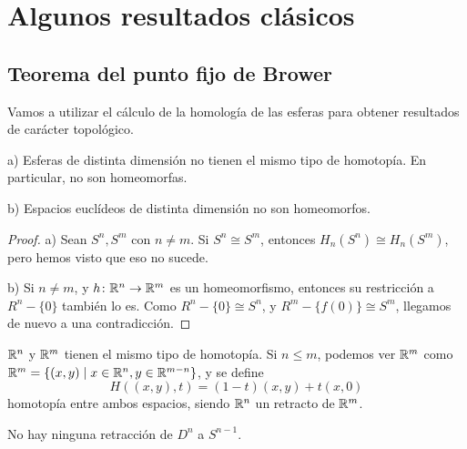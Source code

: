 \chapter{Algunos resultados clásicos}\label{ch:resultados}

\section{Teorema del punto fijo de Brower}

Vamos a utilizar el cálculo de la homología de las esferas para obtener resultados
de carácter topológico.

\begin{proposition}
  a) Esferas de distinta dimensión no tienen el mismo tipo de homotopía. En particular, no son homeomorfas.

  b) Espacios euclídeos de distinta dimensión no son homeomorfos.
\end{proposition}

\begin{proof}
  a) Sean $S^n, S^m$ con $n \neq m$. Si $S^n \cong S^m$, entonces $H_n(S^n) \cong H_n(S^m)$, pero hemos visto que eso no sucede.

  b) Si $n \neq m$, y $h \colon \mathbb{R}^n \to \mathbb{R}^m$ es un homeomorfismo, entonces su restricción a $R^n - \{0\}$ también lo es.
  Como $R^n - \{0\} \cong S^n$, y $R^m - \{f(0)\} \cong S^m$, llegamos de nuevo a una contradicción.
\end{proof}

\begin{remark}
  $\mathbb{R}^n$ y $\mathbb{R}^m$ tienen el mismo tipo de homotopía. Si $n \leq m$, podemos ver $\mathbb{R}^m$ como \\
  $\mathbb{R}^m = \{(x, y) \mid x \in \mathbb{R}^n, y \in \mathbb{R}^{m-n}\}$, y se define
  \[ H((x, y), t) = (1-t)(x, y) + t(x, 0) \]
  homotopía entre ambos espacios, siendo $\mathbb{R}^n$ un retracto de $\mathbb{R}^m$.
\end{remark}

\begin{lemma}
  No hay ninguna retracción de $D^n$ a $S^{n-1}$.
\end{lemma}

